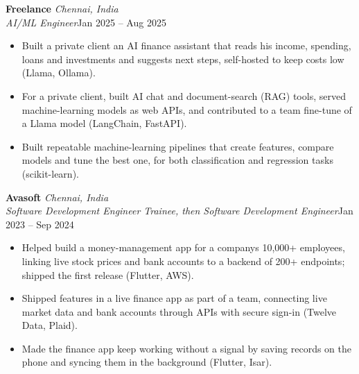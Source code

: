 \documentclass[a4paper,11pt]{article}
\newcommand{\role}[4]{%
  \textbf{#1}{\color{muted}\,\textperiodcentered\,\textit{#2}}\\
  \textit{#4}\hfill{\color{muted}#3}\par}
\newcommand{\gap}{\vspace{5pt}}
\begin{document}
\gap
{}
\role{Freelance}{Chennai, India}{Jan 2025 – Aug 2025}{AI/ML Engineer}
\begin{itemize}
  \item Built a private client an AI finance assistant that reads his income, spending, loans and investments and suggests next steps, self-hosted to keep costs low (Llama, Ollama).
  \item For a private client, built AI chat and document-search (RAG) tools, served machine-learning models as web APIs, and contributed to a team fine-tune of a Llama model (LangChain, FastAPI).
  \item Built repeatable machine-learning pipelines that create features, compare models and tune the best one, for both classification and regression tasks (scikit-learn).
\end{itemize}
\gap
{}
\role{Avasoft}{Chennai, India}{Jan 2023 – Sep 2024}{Software Development Engineer Trainee, then Software Development Engineer}
\begin{itemize}
  \item Helped build a money-management app for a company\textquotesingle{}s 10,000+ employees, linking live stock prices and bank accounts to a backend of 200+ endpoints; shipped the first release (Flutter, AWS).
  \item Shipped features in a live finance app as part of a team, connecting live market data and bank accounts through APIs with secure sign-in (Twelve Data, Plaid).
  \item Made the finance app keep working without a signal by saving records on the phone and syncing them in the background (Flutter, Isar).
\end{itemize}
\end{document}
